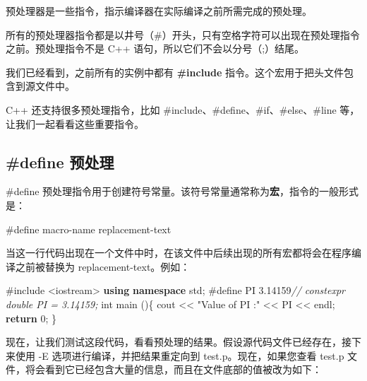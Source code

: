 \documentclass[
]{article}
\newenvironment{Shaded}{}{}
\newcommand{\CommentTok}[1]{\textcolor[rgb]{0.38,0.63,0.69}{\textit{#1}}}
\newcommand{\ControlFlowTok}[1]{\textcolor[rgb]{0.00,0.44,0.13}{\textbf{#1}}}
\newcommand{\DataTypeTok}[1]{\textcolor[rgb]{0.56,0.13,0.00}{#1}}
\newcommand{\DecValTok}[1]{\textcolor[rgb]{0.25,0.63,0.44}{#1}}
\newcommand{\FloatTok}[1]{\textcolor[rgb]{0.25,0.63,0.44}{#1}}
\newcommand{\ImportTok}[1]{#1}
\newcommand{\KeywordTok}[1]{\textcolor[rgb]{0.00,0.44,0.13}{\textbf{#1}}}
\newcommand{\NormalTok}[1]{#1}
\newcommand{\OperatorTok}[1]{\textcolor[rgb]{0.40,0.40,0.40}{#1}}
\newcommand{\PreprocessorTok}[1]{\textcolor[rgb]{0.74,0.48,0.00}{#1}}
\newcommand{\StringTok}[1]{\textcolor[rgb]{0.25,0.44,0.63}{#1}}
\begin{document}
预处理器是一些指令，指示编译器在实际编译之前所需完成的预处理。

所有的预处理器指令都是以井号（\#）开头，只有空格字符可以出现在预处理指令之前。预处理指令不是
C++ 语句，所以它们不会以分号（;）结尾。

我们已经看到，之前所有的实例中都有 \textbf{\#include}
指令。这个宏用于把头文件包含到源文件中。

C++ 还支持很多预处理指令，比如 \#include、\#define、\#if、\#else、\#line
等，让我们一起看看这些重要指令。

\hypertarget{define-ux9884ux5904ux7406}{%
\subsection{\#define 预处理}\label{define-ux9884ux5904ux7406}}

\#define
预处理指令用于创建符号常量。该符号常量通常称为\textbf{宏}，指令的一般形式是：

\begin{Shaded}
\begin{Highlighting}[]
\PreprocessorTok{\#define macro}\OperatorTok{{-}}\NormalTok{name}\PreprocessorTok{ }\NormalTok{replacement}\OperatorTok{{-}}\NormalTok{text}
\end{Highlighting}
\end{Shaded}

当这一行代码出现在一个文件中时，在该文件中后续出现的所有宏都将会在程序编译之前被替换为
replacement-text。例如：

\begin{Shaded}
\begin{Highlighting}[]
\PreprocessorTok{\#include }\ImportTok{\textless{}iostream\textgreater{}}
\KeywordTok{using} \KeywordTok{namespace}\NormalTok{ std}\OperatorTok{;}
\PreprocessorTok{\#define PI }\FloatTok{3.14159}\CommentTok{// constexpr double PI = 3.14159;}
\DataTypeTok{int}\NormalTok{ main }\OperatorTok{()\{}
\NormalTok{   cout }\OperatorTok{\textless{}\textless{}} \StringTok{"Value of PI :"} \OperatorTok{\textless{}\textless{}}\NormalTok{ PI }\OperatorTok{\textless{}\textless{}}\NormalTok{ endl}\OperatorTok{;}     
   \ControlFlowTok{return} \DecValTok{0}\OperatorTok{;}
\OperatorTok{\}}
\end{Highlighting}
\end{Shaded}

现在，让我们测试这段代码，看看预处理的结果。假设源代码文件已经存在，接下来使用
-E 选项进行编译，并把结果重定向到 test.p。现在，如果您查看 test.p
文件，将会看到它已经包含大量的信息，而且在文件底部的值被改为如下：
\end{document}
